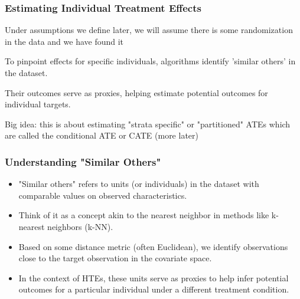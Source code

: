 \documentclass{beamer}
\begin{document}
\begin{frame}
\frametitle{Estimating Individual Treatment Effects}

Under assumptions we define later, we will assume there is some randomization in the data and we have found it

\bigskip

To pinpoint effects for specific individuals, algorithms identify 'similar others' in the dataset. 

\bigskip 

Their outcomes serve as proxies, helping estimate potential outcomes for individual targets. 

\bigskip 

Big idea: this is about estimating "strata specific" or "partitioned" ATEs which are called the conditional ATE or CATE (more later)
\end{frame}

\begin{frame}
\frametitle{Understanding "Similar Others"}

\begin{itemize}
    \item "Similar others" refers to units (or individuals) in the dataset with comparable values on observed characteristics.
    
    \bigskip
    
    \item Think of it as a concept akin to the nearest neighbor in methods like k-nearest neighbors (k-NN).
    
    \bigskip
    
    \item Based on some distance metric (often Euclidean), we identify observations close to the target observation in the covariate space.
    
    \bigskip
    
    \item In the context of HTEs, these units serve as proxies to help infer potential outcomes for a particular individual under a different treatment condition.
    
\end{itemize}
\end{frame}
\end{document}
